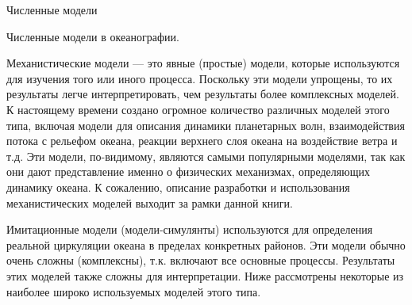 \begin{chapter}{Численные модели}
\begin{section}{Численные модели в океанографии.}
\begin{paragraph}{Механистические модели}
--- это явные (простые) модели, которые используются для изучения того
или иного процесса. Поскольку эти модели упрощены, то их результаты
легче интерпретировать, чем результаты более комплексных моделей. К
настоящему времени создано огромное количество различных моделей этого
типа, включая модели для описания динамики планетарных волн,
взаимодействия потока с рельефом океана, реакции верхнего слоя океана
на воздействие ветра и т.д. Эти модели, по-видимому, являются самыми
популярными моделями, так как они дают представление именно о
физических механизмах, определяющих динамику океана. К сожалению,
описание разработки и использования механистических моделей выходит за
рамки данной книги.
% 
\end{paragraph}

\begin{paragraph}{Имитационные модели}
(модели-симулянты) используются для определения реальной циркуляции
океана в пределах конкретных районов. Эти модели обычно очень сложны
(комплексны), т.к. включают все основные процессы. Результаты этих
моделей также сложны для интерпретации. Ниже рассмотрены некоторые из
наиболее широко используемых моделей этого типа.
%


\end{paragraph}
\end{section}
\end{chapter}
